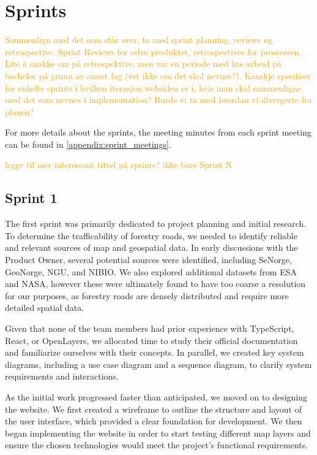 \section{Sprints}

\textcolor{orange}{Sammenlign med det som står over, ta med sprint planning, reviews og retrospective. Sprint Reviews for selve produktet, retrospectives for prossessen. Lite å snakke om på retrospektive, men var en periode med lite arbeid på bachelor på grunn av annet fag (vet ikke om det skal nevnes?). Kanskje spesifiser for enkelte sprints i hvilken iterasjon websiden er i, hvis man skal sammenligne med det som nevnes i implementation? Burde vi ta med hvordan vi divergerte fra planen?}

For more details about the sprints, the meeting minutes from each sprint meeting can be found in \autoref{appendix:sprint_meetings}.

\textcolor{orange}{legge til mer interessant tittel på sprints? ikke bare Sprint N}

\subsection*{Sprint 1}

The first sprint was primarily dedicated to project planning and initial research.  To determine the trafficability of forestry roads, we needed to identify reliable and relevant sources of map and geospatial data. In early discussions with the Product Owner, several potential sources were identified, including SeNorge, GeoNorge, NGU, and NIBIO. We also explored additional datasets from ESA and NASA, however these were ultimately found to have too coarse a resolution for our purposes, as forestry roads are densely distributed and require more detailed spatial data.

Given that none of the team members had prior experience with TypeScript, React, or OpenLayers, we allocated time to study their official documentation and familiarize ourselves with their concepts. In parallel, we created key system diagrams, including a use case diagram and a sequence diagram, to clarify system requirements and interactions. 

As the initial work progressed faster than anticipated, we moved on to designing the website. We first created a wireframe to outline the structure and layout of the user interface, which provided a clear foundation for development. We then began implementing the website in order to start testing different map layers and ensure the chosen technologies would meet the project’s functional requirements.

